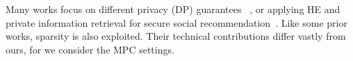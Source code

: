 Many works focus on different privacy (DP) guarantees%
~\cite{tnn/WuPCLZY21,ccs/SajadmaneshG21,pvldb/PatwaSGMR23},
or %
applying HE and private information retrieval for secure social recommendation~\cite{nips/CuiCLYW21}.
Like some prior works, sparsity is also exploited.
Their technical contributions differ vastly from ours, for we consider %
the MPC settings.